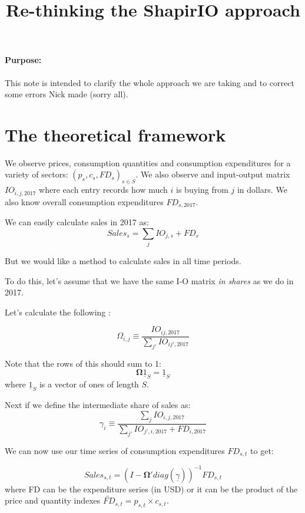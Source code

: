 \documentclass[12pt,english]{article}
\begin{document}


\title{Re-thinking the ShapirIO approach}
\maketitle

\paragraph{Purpose:} This note is intended to clarify the whole approach we are taking and to correct some errors Nick made (sorry all).

\section*{The theoretical framework}

We observe prices, consumption quantities and consumption expenditures for a variety of sectors: $(p_s,c_s,FD_s)_{s\in S}$. We also observe and input-output matrix $IO_{i,j,2017}$ where each entry records how much $i$ is buying from $j$ in dollars. We also know overall consumption expenditures $FD_{s,2017}$.

We can easily calculate sales in 2017 as:
\[
	Sales_s = \sum_{j}IO_{j,s}+FD_s
\]

But we would like a method to calculate sales in all time periods.

To do this, let's assume that we have the same I-O matrix \emph{in shares} as we do in 2017.

Let's calculate the following :

\[
	\Omega_{i,j}\equiv\frac{IO_{ij,2017}}{\sum_{j'}IO_{ij',2017}}
\]

Note that the rows of this should sum to 1:
\[
	\mathbold{\Omega}\underline{1}_S = \underline{1}_S
\]
where $\underline{1}_S$ is a vector of ones of length $S$.

Next if we define the intermediate share of sales as:
\[
	\gamma_{i} \equiv \frac{\sum_j IO_{i,j,2017}}{\sum_{j'}IO_{j',i,2017}+FD_{i,2017}}
\]

We can now use our time series of consumption expenditures $FD_{s,t}$ to get:

\[
	Sales_{s,t} = (I-\mathbold{\Omega}'diag(\underline{\gamma}))^{-1}FD_{s,t} 
\]
where FD can be the expenditure series (in USD) or it can be the product of the price and quantity indexes $\widetilde{FD}_{s,t}=p_{s,t}\times c_{s,t}$.
\end{document}
